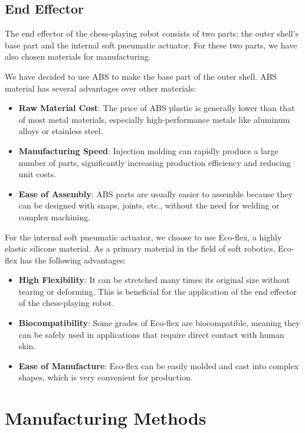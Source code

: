 \documentclass[10pt, a4paper, twocolumn]{article}
\begin{document}
\subsection{End Effector}
The end effector of the chess-playing robot consists of two parts: the outer shell's base part and the internal soft pneumatic actuator. For these two parts, we have also chosen materials for manufacturing.

We have decided to use ABS to make the base part of the outer shell. ABS material has several advantages over other materials:
\begin{itemize}
    \item \textbf{Raw Material Cost}: The price of ABS plastic is generally lower than that of most metal materials, especially high-performance metals like aluminum alloys or stainless steel.
    \item \textbf{Manufacturing Speed}: Injection molding can rapidly produce a large number of parts, significantly increasing production efficiency and reducing unit costs.
    \item \textbf{Ease of Assembly}: ABS parts are usually easier to assemble because they can be designed with snaps, joints, etc., without the need for welding or complex machining.
\end{itemize}

For the internal soft pneumatic actuator, we choose to use Eco-flex, a highly elastic silicone material. As a primary material in the field of soft robotics, Eco-flex has the following advantages:
\begin{itemize}
    \item \textbf{High Flexibility}: It can be stretched many times its original size without tearing or deforming. This is beneficial for the application of the end effector of the chess-playing robot.
    \item \textbf{Biocompatibility}: Some grades of Eco-flex are biocompatible, meaning they can be safely used in applications that require direct contact with human skin.
    \item \textbf{Ease of Manufacture}: Eco-flex can be easily molded and cast into complex shapes, which is very convenient for production. 
\end{itemize}

\section{Manufacturing Methods}
\end{document}
